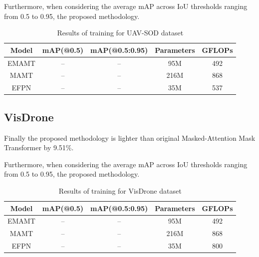 Furthermore, when considering the average mAP across IoU thresholds ranging
from 0.5 to 0.95, the proposed methodology.


\begin{table}[h]
    \centering
    \begin{tabular}{|c|c|c|c|c|}
        \hline
        \textbf{Model}     & \textbf{mAP(@0.5)}    & \textbf{mAP(@0.5:0.95)}  & \textbf{Parameters} & \textbf{GFLOPs}  \\ \hline
        EMAMT              & --                    & --                       & 95M                 &  492             \\ \hline
        MAMT               & --                    & --                       & 216M                &  868             \\ \hline
        EFPN               & --                    & --                       & 35M                 &  537             \\ \hline
    \end{tabular}
    \caption{Results of training for UAV-SOD dataset}
    \label{tab:uav_results}
\end{table}



\subsection{VisDrone}


Finally the proposed methodology is lighter than original Masked-Attention Mask Transformer by 9.51\%. 

Furthermore, when considering the average mAP across IoU thresholds ranging
from 0.5 to 0.95, the proposed methodology.



\begin{table}[h]
    \centering
    \begin{tabular}{|c|c|c|c|c|}
        \hline
        \textbf{Model}     & \textbf{mAP(@0.5)}     & \textbf{mAP(@0.5:0.95)}  & \textbf{Parameters} & \textbf{GFLOPs}  \\ \hline
        EMAMT              & --                     & --                       & 95M                 &  492             \\ \hline
        MAMT               & --                     & --                       & 216M                &  868             \\ \hline
        EFPN               & --                     & --                       & 35M                 &  800              \\ \hline
    \end{tabular}
    \caption{Results of training for VisDrone dataset}
    \label{tab:vis_results}
\end{table}